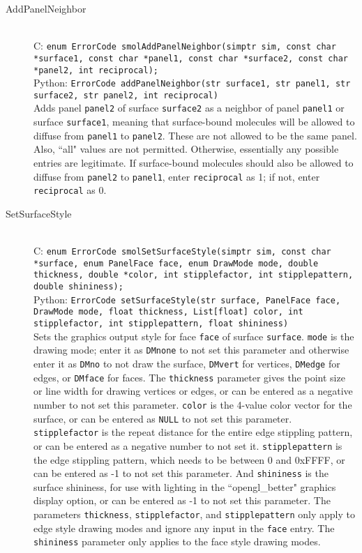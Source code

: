 \documentclass {book}
\begin{document}
\begin{description}
\item[AddPanelNeighbor]
\hfill \\
C: \texttt{enum ErrorCode smolAddPanelNeighbor(simptr sim, const char *surface1, const char *panel1, const char *surface2, const char *panel2, int reciprocal);}\\
Python: \texttt{ErrorCode addPanelNeighbor(str surface1, str panel1, str surface2, str panel2, int reciprocal)}\\
Adds panel \texttt{panel2} of surface \texttt{surface2} as a neighbor of panel \texttt{panel1} or surface \texttt{surface1}, meaning that surface-bound molecules will be allowed to diffuse from \texttt{panel1} to \texttt{panel2}. These are not allowed to be the same panel. Also, ``all" values are not permitted. Otherwise, essentially any possible entries are legitimate. If surface-bound molecules should also be allowed to diffuse from \texttt{panel2} to \texttt{panel1}, enter \texttt{reciprocal} as 1; if not, enter \texttt{reciprocal} as 0.

\item[SetSurfaceStyle]
\hfill \\
C: \texttt{enum ErrorCode smolSetSurfaceStyle(simptr sim, const char *surface, enum PanelFace face, enum DrawMode mode, double thickness, double *color, int stipplefactor, int stipplepattern, double shininess);}\\
Python: \texttt{ErrorCode setSurfaceStyle(str surface, PanelFace face, DrawMode mode, float thickness, List[float] color, int stipplefactor, int stipplepattern, float shininess)}\\
Sets the graphics output style for face \texttt{face} of surface \texttt{surface}. \texttt{mode} is the drawing mode; enter it as \texttt{DMnone} to not set this parameter and otherwise enter it as \texttt{DMno} to not draw the surface, \texttt{DMvert} for vertices, \texttt{DMedge} for edges, or \texttt{DMface} for faces. The \texttt{thickness} parameter gives the point size or line width for drawing vertices or edges, or can be entered as a negative number to not set this parameter. \texttt{color} is the 4-value color vector for the surface, or can be entered as \texttt{NULL} to not set this parameter. \texttt{stipplefactor} is the repeat distance for the entire edge stippling pattern, or can be entered as a negative number to not set it. \texttt{stipplepattern} is the edge stippling pattern, which needs to be between 0 and 0xFFFF, or can be entered as -1 to not set this parameter. And \texttt{shininess} is the surface shininess, for use with lighting in the ``opengl\_better" graphics display option, or can be entered as -1 to not set this parameter. The parameters \texttt{thickness}, \texttt{stipplefactor}, and \texttt{stipplepattern} only apply to edge style drawing modes and ignore any input in the \texttt{face} entry. The \texttt{shininess} parameter only applies to the face style drawing modes.

\end{description}
\end{document}
